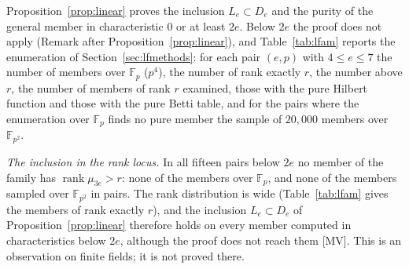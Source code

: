 \documentclass[11pt]{article}
\theoremstyle{definition}
\theoremstyle{remark}
\newcommand{\F}{\mathbb{F}}
\begin{document}
Proposition~\ref{prop:linear} proves the inclusion $L_e\subset D_e$ and the purity of the general member in characteristic $0$ or at least $2e$. Below $2e$ the proof does not apply (Remark after Proposition~\ref{prop:linear}), and Table~\ref{tab:lfam} reports the enumeration of Section~\ref{sec:lfmethods}: for each pair $(e,p)$ with $4\le e\le7$ the number of members over $\F_p$ ($p^4$), the number of rank exactly $r$, the number above $r$, the number of members of rank $r$ examined, those with the pure Hilbert function and those with the pure Betti table, and for the pairs where the enumeration over $\F_p$ finds no pure member the sample of $20{,}000$ members over $\F_{p^2}$.

\begin{table}[htbp]
\centering\footnotesize

\caption{The linear family $L_e(a,b,c,d)$ over $\F_p$ for $4\le e\le7$ and the odd primes $p\le13$ (twenty pairs: $p<2e$ for fifteen of them, the other five are control pairs with $p\ge2e$): the number of members ($p^4$), of rank $\mu_{3e}$ exactly $r=2u(2e)-2$, above $r$, the number of members of rank $r$ examined (all of them, or the first ones in the lexicographic order of the parameters when the second stage stopped early), those with the pure Hilbert function, those with the pure Betti table, and, for the nine pairs below $2e$ without a pure member over $\F_p$, the pure members among the members of rank $r$ in a sample of $20{,}000$ over $\F_{p^2}$.}
\label{tab:lfam}
\end{table}

\emph{The inclusion in the rank locus.} In all fifteen pairs below $2e$ no member of the family has $\operatorname{rank}\mu_{3e}>r$: none of the \nlfFamilyMembersBelow{} members over $\F_p$, and none of the \nlfYMembers{} members sampled over $\F_{p^2}$ in \nlfYPairs{} pairs. The rank distribution is wide (Table~\ref{tab:lfam} gives the members of rank exactly $r$), and the inclusion $L_e\subset D_e$ of Proposition~\ref{prop:linear} therefore holds on every member computed in characteristics below $2e$, although the proof does not reach them [MV]. This is an observation on finite fields; it is not proved there.
\end{document}
